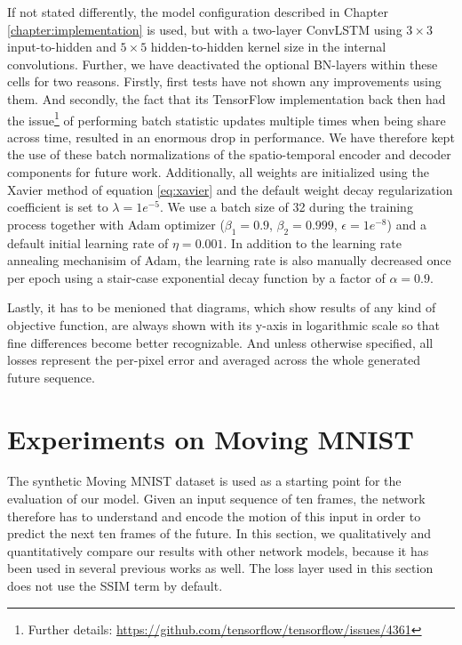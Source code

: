 If not stated differently, the model configuration described in Chapter \ref{chapter:implementation} is used, but with a two-layer ConvLSTM using $3\times3$ input-to-hidden and $5\times5$ hidden-to-hidden kernel size in the internal convolutions. Further, we have deactivated the optional BN-layers within these cells for two reasons. Firstly, first tests have not shown any improvements using them. And secondly, the fact that its TensorFlow implementation back then had the issue\footnote{Further details: \url{https://github.com/tensorflow/tensorflow/issues/4361}} of performing batch statistic updates multiple times when being share across time, resulted in an enormous drop in performance. We have therefore kept the use of these batch normalizations of the spatio-temporal encoder and decoder components for future work. Additionally, all weights are initialized using the Xavier method of equation \ref{eq:xavier} and the default weight decay regularization coefficient is set to $\lambda=1e^{-5}$. We use a batch size of 32 during the training process together with Adam optimizer ($\beta_1 = 0.9$, $\beta_2 = 0.999$, $\epsilon =1e^{-8}$) and a default initial learning rate of $\eta = 0.001$. In addition to the learning rate annealing mechanisim of Adam, the learning rate is also manually decreased once per epoch using a stair-case exponential decay function by a factor of $\alpha=0.9$.

Lastly, it has to be menioned that diagrams, which show results of any kind of objective function, are always shown with its y-axis in logarithmic scale so that fine differences become better recognizable. And unless otherwise specified, all losses represent the per-pixel error and averaged across the whole generated future sequence.

\section{Experiments on Moving MNIST}

The synthetic Moving MNIST dataset is used as a starting point for the evaluation of our model. Given an input sequence of ten frames, the network therefore has to understand and encode the motion of this input in order to predict the next ten frames of the future. In this section, we qualitatively and quantitatively compare our results with other network models, because it has been used in several previous works as well. The loss layer used in this section does not use the SSIM term by default.


